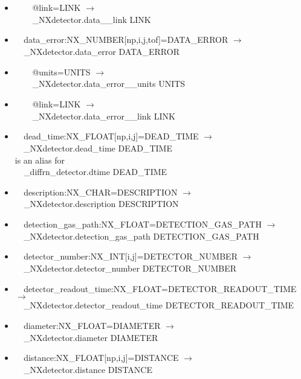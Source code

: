 \documentclass[11pt]{article}
\begin{document}
{{\begin{itemize}
\item{\verb|    |@link=LINK $\rightarrow$\\
\verb|    |\_NXdetector.data\_\_link LINK}

\item{\verb|  |data\_error:NX\_NUMBER[np,i,j,tof]=DATA\_ERROR $\rightarrow$\\
\verb|  |\_NXdetector.data\_error DATA\_ERROR}

\item{\verb|    |@units=UNITS $\rightarrow$\\
\verb|    |\_NXdetector.data\_error\_\_units UNITS}

\item{\verb|    |@link=LINK $\rightarrow$\\
\verb|    |\_NXdetector.data\_error\_\_link LINK}

\item{\verb|  |dead\_time:NX\_FLOAT[np,i,j]=DEAD\_TIME $\rightarrow$\\
\verb|  |\_NXdetector.dead\_time DEAD\_TIME\\
is an alias for\\
\verb|  |\_diffrn\_detector.dtime DEAD\_TIME}

\item{\verb|  |description:NX\_CHAR=DESCRIPTION $\rightarrow$\\
\verb|  |\_NXdetector.description DESCRIPTION}

\item{\verb|  |detection\_gas\_path:NX\_FLOAT=DETECTION\_GAS\_PATH $\rightarrow$\\
\verb|  |\_NXdetector.detection\_gas\_path DETECTION\_GAS\_PATH}

\item{\verb|  |detector\_number:NX\_INT[i,j]=DETECTOR\_NUMBER $\rightarrow$\\
\verb|  |\_NXdetector.detector\_number DETECTOR\_NUMBER}

\item{\verb|  |detector\_readout\_time:NX\_FLOAT=DETECTOR\_READOUT\_TIME $\rightarrow$\\
\verb|  |\_NXdetector.detector\_readout\_time DETECTOR\_READOUT\_TIME}

\item{\verb|  |diameter:NX\_FLOAT=DIAMETER $\rightarrow$\\
\verb|  |\_NXdetector.diameter DIAMETER}

\item{\verb|  |distance:NX\_FLOAT[np,i,j]=DISTANCE $\rightarrow$\\
\verb|  |\_NXdetector.distance DISTANCE}


\end{itemize}}}
\end{document}
